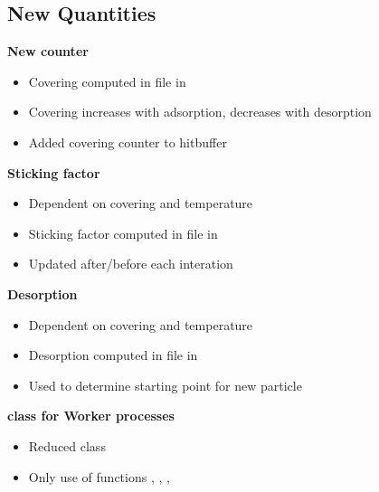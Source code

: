 \subsection{New Quantities}
\textbf{New counter }
\begin{itemize}[noitemsep,topsep=0pt]
\item Covering computed in  file in 
\item Covering increases with adsorption, decreases with desorption
\item Added covering counter to hitbuffer
\end{itemize}
\bigskip
\textbf{Sticking factor}
\begin{itemize}[noitemsep,topsep=0pt]
\item Dependent on covering and temperature
\item Sticking factor computed in  file in 
\item Updated after/before each interation
\end{itemize}
\bigskip
\textbf{Desorption}
\begin{itemize}[noitemsep,topsep=0pt]
\item Dependent on covering and temperature
\item Desorption computed in  file in 
\item Used to determine starting point for new particle
\end{itemize}
\bigskip
\textbf{ class for Worker processes}
\begin{itemize}[noitemsep,topsep=0pt]
\item Reduced  class
\item Only use of functions , , , 
\end{itemize}

